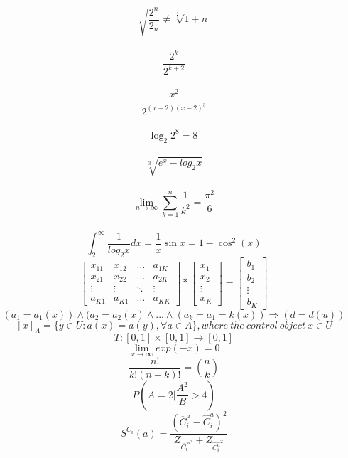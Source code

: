 \documentclass[12pt, letterpaper, titlepage]{article}
\begin{document}
$$ \sqrt{ \frac{2^{n}}{2_n}} \neq \sqrt[\frac{1}{3}]{1+n} $$\\
$$ \frac{2^{k}}{2^{k+2}} $$\\
$$ \frac{x^{2}}{2^{(x+2)(x-2)^3}} $$\\
$$ \log_{2}2^{8}=8 \ $$\\ 
$$ \sqrt[3]{e^{x}-log_{2}x} $$\\
$$ \lim_{n\rightarrow\infty}\sum_{k=1}^{n} \frac{1}{k^2}= \frac{\pi^{2}}{6}$$\\
$$ \int_{2}^{\infty}\frac{1}{log_{2}x}dx=\frac{1}{x}\sin{x}=1-\cos^{2}(x)$$
$$\mathbf{}
\left[ \begin{array}{cccc}
x_{11} & x_{12} & \ldots & a_{1K} \\ 
x_{21} & x_{22} & \ldots & a_{2K} \\
\vdots & \vdots & \ddots & \vdots \\
a_{K1} & a_{K1} & \ldots & a_{KK}
\end{array} \right]
*
\mathbf{}
\left[ \begin{array}{c}
x_{1} \\ 
x_{2} \\
\vdots\\
x_{K} 
\end{array} \right]
=
\mathbf{}
\left[ \begin{array}{c}
b_{1} \\ 
b_{2} \\
\vdots\\
b_{K} 
\end{array} \right]$$
$$(a_1=a_1(x)) \wedge (a_2=a_2(x) \wedge ... \wedge (a_k=a_1=k(x))\Rightarrow (d=d(u))$$
$$[x]_A=\{y\in U:a(x)=a(y),\forall a \in A\}, where \ the \ control \ object \ x \in U$$
$$T:[0,1]\times[0,1]\rightarrow[0,1]$$
$$\lim_{x\rightarrow\infty} exp(-x)=0 $$
$$\frac{n!}{k!(n-k)!} =  {n \choose k} $$
$$P\left(A=2\bigg|\frac{A^2}{B}>4\right)$$
$$S^{C_i}(a)=\frac{(\overline{C}^{a}_i-\hat{C}^a_i)^2}{Z_{\overline{{C_i}}^{a^2}}+Z_{\hat{C^a_i}^2}}$$
\end{document}
